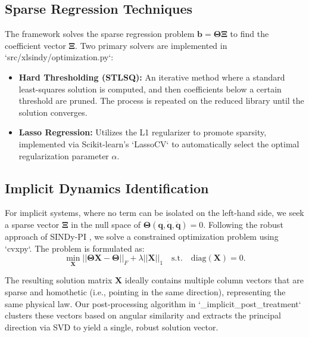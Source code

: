 \documentclass[12pt]{article}
\begin{document}
\subsection*{Sparse Regression Techniques}
The framework solves the sparse regression problem $\mathbf{b} = \mathbf{\Theta}\mathbf{\Xi}$ to find the coefficient vector $\mathbf{\Xi}$. Two primary solvers are implemented in `src/xlsindy/optimization.py`:
\begin{itemize}
    \item \textbf{Hard Thresholding (STLSQ):} An iterative method where a standard least-squares solution is computed, and then coefficients below a certain threshold are pruned. The process is repeated on the reduced library until the solution converges.
    \item \textbf{Lasso Regression:} Utilizes the L1 regularizer to promote sparsity, implemented via Scikit-learn's `LassoCV` to automatically select the optimal regularization parameter $\alpha$.
\end{itemize}

\subsection*{Implicit Dynamics Identification}
For implicit systems, where no term can be isolated on the left-hand side, we seek a sparse vector $\mathbf{\Xi}$ in the null space of $\mathbf{\Theta}(\mathbf{q}, \dot{\mathbf{q}}, \ddot{\mathbf{q}})=0$. Following the robust approach of SINDy-PI \cite{Kaheman2020_SINDyPI}, we solve a constrained optimization problem using `cvxpy`. The problem is formulated as:
\begin{equation}
	\min_{\mathbf{X}} ||\mathbf{\Theta X} - \mathbf{\Theta}||_F + \lambda||\mathbf{X}||_1 \quad \text{s.t.} \quad \text{diag}(\mathbf{X}) = 0.
\end{equation}

The resulting solution matrix $\mathbf{X}$ ideally contains multiple column vectors that are sparse and homothetic (i.e., pointing in the same direction), representing the same physical law. Our post-processing algorithm in `\_implicit\_post\_treatment` clusters these vectors based on angular similarity and extracts the principal direction via SVD to yield a single, robust solution vector.
\end{document}
